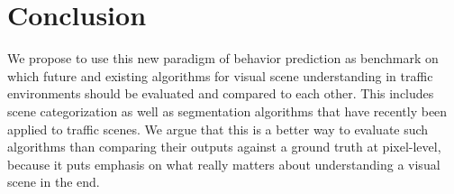 \documentclass{bmvc2k}
\begin{document}
\section{Conclusion}
\label{sec:conclusion}
We propose to use this new paradigm of behavior prediction as benchmark on which future and existing algorithms for visual scene understanding in traffic environments should be evaluated and compared to each other. This includes scene categorization as well as segmentation algorithms that have recently been applied to traffic scenes. We argue that this is a better way to evaluate such algorithms than comparing their outputs against a ground truth at pixel-level, because it puts emphasis on what really matters about understanding a visual scene in the end.





\end{document}
